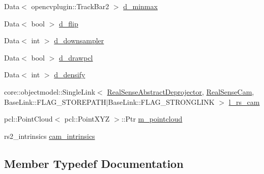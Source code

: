 \begin{DoxyCompactItemize}
Data$<$ opencvplugin\+::\+Track\+Bar2 $>$ \hyperlink{classsofa_1_1rgbdtracking_1_1_real_sense_abstract_deprojector_a8c68e247b9ec182e5b014e1d52ed5284}{d\+\_\+minmax}
\item 
Data$<$ bool $>$ \hyperlink{classsofa_1_1rgbdtracking_1_1_real_sense_abstract_deprojector_a57a20129ea423d43053c11764b39640a}{d\+\_\+flip}
\item 
Data$<$ int $>$ \hyperlink{classsofa_1_1rgbdtracking_1_1_real_sense_abstract_deprojector_aa28563fc31f5d63f1df5b32940a2e305}{d\+\_\+downsampler}
\item 
Data$<$ bool $>$ \hyperlink{classsofa_1_1rgbdtracking_1_1_real_sense_abstract_deprojector_afd99828d27af6b6c40cc17dec09fd818}{d\+\_\+drawpcl}
\item 
Data$<$ int $>$ \hyperlink{classsofa_1_1rgbdtracking_1_1_real_sense_abstract_deprojector_ac850857f7f2460b014b5d16545904231}{d\+\_\+densify}
\item 
core\+::objectmodel\+::\+Single\+Link$<$ \hyperlink{classsofa_1_1rgbdtracking_1_1_real_sense_abstract_deprojector}{Real\+Sense\+Abstract\+Deprojector}, \hyperlink{classsofa_1_1rgbdtracking_1_1_real_sense_cam}{Real\+Sense\+Cam}, Base\+Link\+::\+F\+L\+A\+G\+\_\+\+S\+T\+O\+R\+E\+P\+A\+TH$\vert$Base\+Link\+::\+F\+L\+A\+G\+\_\+\+S\+T\+R\+O\+N\+G\+L\+I\+NK $>$ \hyperlink{classsofa_1_1rgbdtracking_1_1_real_sense_abstract_deprojector_aab3f3872a892158eb75c162ceb9dc270}{l\+\_\+rs\+\_\+cam}
\item 
pcl\+::\+Point\+Cloud$<$ pcl\+::\+Point\+X\+YZ $>$\+::Ptr \hyperlink{classsofa_1_1rgbdtracking_1_1_real_sense_abstract_deprojector_a3317c507cc889b1537c708abb50196da}{m\+\_\+pointcloud}
\item 
rs2\+\_\+intrinsics \hyperlink{classsofa_1_1rgbdtracking_1_1_real_sense_abstract_deprojector_abb8025a1f9a471ec9370263b637271f4}{cam\+\_\+intrinsics}
\end{DoxyCompactItemize}


\subsection{Member Typedef Documentation}
\mbox{\label{classsofa_1_1rgbdtracking_1_1_real_sense_abstract_deprojector_a9b4cae154f99cca58b05da9c4b0084ab}} 
